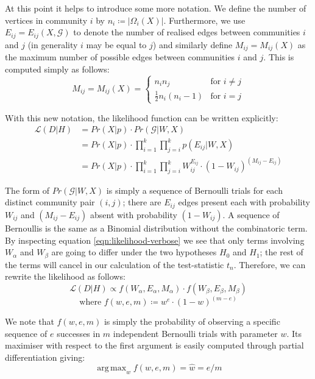 \documentclass[]{article}
\DeclareMathOperator*{\argmax}{arg\,max}
\newcommand{\Gcal}{\mathcal{G}}
\newcommand{\lik}{\mathcal{L}}
\begin{document}
\begin{multicols*}{2}
At this point it helps to introduce some more notation. We define the number of vertices in community $i$ by $n_i \coloneqq |\Omega_i(X)|$. Furthermore, we use $E_{ij} = E_{ij}(X, \Gcal)$ to denote the number of realised edges between communities $i$ and $j$ (in generality $i$ may be equal to $j$) and similarly define $M_{ij} = M_{ij}(X)$ as the maximum number of possible edges between communities $i$ and $j$. This is computed simply as follows:
%
\begin{equation}
	M_{ij} = M_{ij} (X) = \begin{cases}
		n_i n_j &\text{for } i \neq j \\
		\frac{1}{2}n_i (n_i - 1) &\text{for } i = j
	\end{cases}
\end{equation}

With this new notation, the likelihood function can be written explicitly:
%
\begin{align}
\lik(D | H) &= Pr(X| p) \cdot Pr(\Gcal | W, X) \nonumber \\
&= Pr(X | p) \cdot \prod_{i=1}^{k} \prod_{j=i}^{k} p(E_{ij} | W, X) \nonumber \\
&= Pr(X | p) \cdot \prod_{i=1}^{k} \prod_{j=i}^{k} W_{ij} ^ {E_{ij}} \cdot \left( 1 - W_{ij} \right) ^ {(M_{ij} - E_{ij})}
\label{eqn:likelihood-verbose}
\end{align}

The form of $Pr(\Gcal | W, X)$ is simply a sequence of Bernoulli trials for each distinct community pair $(i, j)$; there are $E_{ij}$ edges present each with probability $W_{ij}$ and $(M_{ij} - E_{ij})$ absent with probability $(1 - W_{ij})$. A sequence of Bernoullis is the same as a Binomial distribution without the combinatoric term. By inspecting equation \ref{eqn:likelihood-verbose} we see that only terms involving $W_{\alpha}$ and $W_{\beta}$ are going to differ under the two hypotheses $H_0$ and $H_1$; the rest of the terms will cancel in our calculation of the test-statistic $t_n$. Therefore, we can rewrite the likelihood as follows:
%
\begin{equation}
	\lik (D | H) \propto f (W_\alpha, E_\alpha, M_\alpha) \cdot f (W_\beta, E_\beta, M_\beta)
\end{equation} 
\begin{equation}
	\textrm{where } f (w, e, m) \coloneqq w^e \cdot (1-w)^{(m - e)}
	\label{eqn:f-defn}
\end{equation}

We note that $f(w, e, m)$ is simply the probability of observing a specific sequence of $e$ successes in $m$ independent Bernoulli trials with parameter $w$. Its maximiser with respect to the first argument is easily computed through partial differentiation giving:
%
\begin{equation}
	\argmax_w f(w, e, m) = \hat{w} = e / m
	\label{eqn:f-maximiser}
\end{equation}


\end{multicols*}
\end{document}
